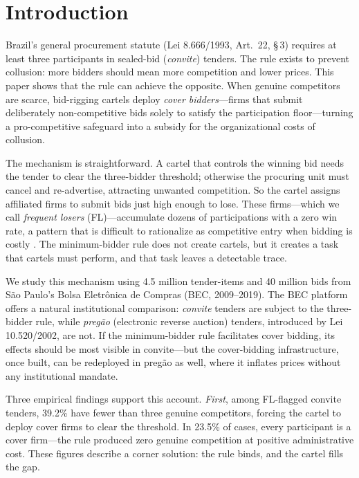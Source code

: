 \section{Introduction}
\label{sec:intro}

Brazil's general procurement statute (Lei 8.666/1993, Art.\ 22,
\S\,3) requires at least three participants in sealed-bid
(\emph{convite}) tenders. The rule exists to prevent collusion: more
bidders should mean more competition and lower prices. This paper
shows that the rule can achieve the opposite. When genuine
competitors are scarce, bid-rigging cartels deploy \emph{cover
bidders}---firms that submit deliberately non-competitive bids solely
to satisfy the participation floor---turning a pro-competitive
safeguard into a subsidy for the organizational costs of collusion.

The mechanism is straightforward. A cartel that controls the winning
bid needs the tender to clear the three-bidder threshold; otherwise
the procuring unit must cancel and re-advertise, attracting
unwanted competition. So the cartel assigns affiliated firms to
submit bids just high enough to lose. These firms---which we call
\emph{frequent losers} (FL)---accumulate dozens of participations
with a zero win rate, a pattern that is difficult to rationalize as
competitive entry when bidding is costly
\citep{marshall2012economics, asker2010leniency}. The minimum-bidder
rule does not create cartels, but it creates a task that cartels
must perform, and that task leaves a detectable trace.

We study this mechanism using 4.5 million tender-items and 40 million
bids from S\~ao Paulo's Bolsa Eletr\^onica de Compras (BEC,
2009--2019). The BEC platform offers a natural institutional
comparison: \emph{convite} tenders are subject to the three-bidder
rule, while \emph{preg\~ao} (electronic reverse auction) tenders,
introduced by Lei 10.520/2002, are not. If the minimum-bidder rule
facilitates cover bidding, its effects should be most visible in
convite---but the cover-bidding infrastructure, once built, can be
redeployed in preg\~ao as well, where it inflates prices without any
institutional mandate.

Three empirical findings support this account. \emph{First}, among
FL-flagged convite tenders, 39.2\% have fewer than three genuine
competitors, forcing the cartel to deploy cover firms to clear the
threshold. In 23.5\% of cases, every participant is a cover
firm---the rule produced zero genuine competition at positive
administrative cost. These figures describe a corner solution: the
rule binds, and the cartel fills the gap.

